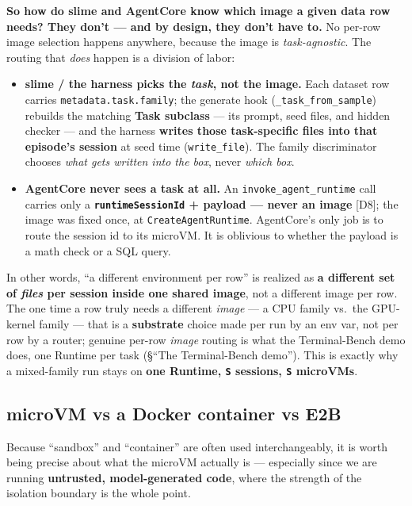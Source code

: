 \documentclass[
  paper=a4,
  ,captions=tableheading
]{scrartcl}
\providecommand{\tightlist}{%
  \setlength{\itemsep}{0pt}\setlength{\parskip}{0pt}}
\begin{document}
\textbf{So how do slime and AgentCore know which image a given data row
needs? They don't --- and by design, they don't have to.} No per-row
image selection happens anywhere, because the image is
\emph{task-agnostic}. The routing that \emph{does} happen is a division
of labor:

\begin{itemize}
\tightlist
\item
  \textbf{slime / the harness picks the \emph{task}, not the image.}
  Each dataset row carries \texttt{metadata.task.family}; the generate
  hook (\texttt{\_task\_from\_sample}) rebuilds the matching
  \textbf{Task subclass} --- its prompt, seed files, and hidden checker
  --- and the harness \textbf{writes those task-specific files into that
  episode's session} at seed time (\texttt{write\_file}). The family
  discriminator chooses \emph{what gets written into the box}, never
  \emph{which box}.
\item
  \textbf{AgentCore never sees a task at all.} An
  \texttt{invoke\_agent\_runtime} call carries only a
  \textbf{\texttt{runtimeSessionId} + payload --- never an image}
  {[}D8{]}; the image was fixed once, at \texttt{CreateAgentRuntime}.
  AgentCore's only job is to route the session id to its microVM. It is
  oblivious to whether the payload is a math check or a SQL query.
\end{itemize}

In other words, ``a different environment per row'' is realized as
\textbf{a different set of \emph{files} per session inside one shared
image}, not a different image per row. The one time a row truly needs a
different \emph{image} --- a CPU family vs.~the GPU-kernel family ---
that is a \textbf{substrate} choice made per run by an env var, not per
row by a router; genuine per-row \emph{image} routing is what the
Terminal-Bench demo does, one Runtime per task (§``The Terminal-Bench
demo''). This is exactly why a mixed-family run stays on \textbf{one
Runtime, \texttt{S} sessions, \texttt{S} microVMs}.

\hypertarget{microvm-vs-a-docker-container-vs-e2b}{%
\subsection{microVM vs a Docker container vs
E2B}\label{microvm-vs-a-docker-container-vs-e2b}}

Because ``sandbox'' and ``container'' are often used interchangeably, it
is worth being precise about what the microVM actually is --- especially
since we are running \textbf{untrusted, model-generated code}, where the
strength of the isolation boundary is the whole point.
\end{document}
